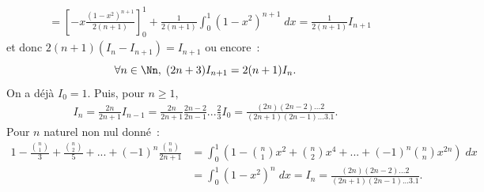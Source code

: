 {\begin{enumerate}
{\begin{align*}
 &=\left[-x\frac{(1-x^2)^{n+1}}{2(n+1)}\right]_{0}^{1}+\frac{1}{2(n+1)}\int_{0}^{1}(1-x^2)^{n+1}\;dx
=\frac{1}{2(n+1)}I_{n+1}
\end{align*}
et donc $2(n+1)(I_n-I_{n+1})=I_{n+1}$ ou encore~:
$$\forall n\in\Nn,\;(2n+3)I_{n+1}=2(n+1)I_n.$$
On a déjà $I_0=1$. Puis, pour $n\geq1$,
\begin{align*}
I_n=\frac{2n}{2n+1}I_{n-1}=\frac{2n}{2n+1}\frac{2n-2}{2n-1}...\frac{2}{3}I_0=\frac{(2n)(2n-2)...2}{(2n+1)(2n-1)...3
.1}.
\end{align*}
Pour $n$
naturel non nul donné~:
\begin{align*}
1-\frac{\binom{n}{1}}{3}+\frac{\binom{n}{2}}{5}+...+(-1)^n\frac{\binom{n}{n}}{2n+1}&=\int_{0}^{1}(1-\binom{n}{1}x^2+\binom{n}{2}x^4+...
+(-1)^n\binom{n}{n}x^{2n})\;dx\\
 &=\int_{0}^{1}(1-x^2)^n\;dx=I_n
=\frac{(2n)(2n-2)...2}{(2n+1)(2n-1)...3.1}.
\end{align*}
}
\end{enumerate}
}

